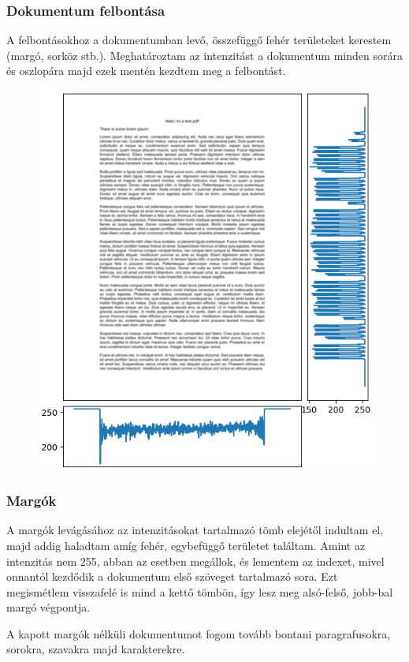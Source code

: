 \documentclass{beamer}
\begin{document}
\begin{frame}[fragile]
\frametitle{Dokumentum felbontása}

A felbontásokhoz a dokumentumban levő, összefüggő fehér területeket kerestem (margó, sorköz stb.). Meghatároztam az intenzitást a dokumentum minden sorára és oszlopára majd ezek mentén kezdtem meg a felbontást.

\smallskip

\begin{figure}[!tbp]
  \centering
  \begin{minipage}[b]{0.45\textwidth}
    \includegraphics[width=\textwidth]{images/intensity.png}
  \end{minipage}
\end{figure}

\end{frame}

\begin{frame}[fragile]
\frametitle{Margók}

A margók levágásához az intenzitásokat tartalmazó tömb elejétől indultam el, majd addig haladtam amíg fehér, egybefüggő területet találtam. Amint az intenzitás nem 255, abban az esetben megállok, és lementem az indexet, mivel onnantól kezdődik a dokumentum első szöveget tartalmazó sora. Ezt megismétlem visszafelé is mind a kettő tömbön, így lesz meg alsó-felső, jobb-bal margó végpontja.

\bigskip

A kapott margók nélküli dokumentumot fogom tovább bontani paragrafusokra, sorokra, szavakra majd karakterekre.

\end{frame}
\end{document}
